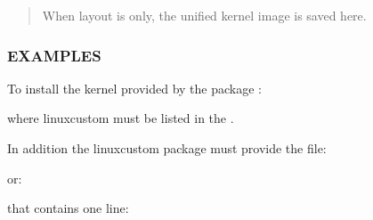 \documentclass[letterpaper,11pt,english]{sphinxmanual}
\begin{document}
\sphinxAtStartPar
{}
\begin{quote}

\sphinxAtStartPar
When layout is  only,
the unified kernel image is saved here.
\end{quote}


\subsubsection{EXAMPLES}
\label{\detokenize{_build/man-ready/sd-boot-kernel-update.8:examples}}
\sphinxAtStartPar
To install the kernel provided by the package :

\begin{sphinxVerbatim}[commandchars=\\\{\}]
\end{sphinxVerbatim}

\sphinxAtStartPar
where linux\sphinxhyphen{}custom must be listed in the .

\sphinxAtStartPar
In addition the linux\sphinxhyphen{}custom package must provide the file:

\begin{sphinxVerbatim}[commandchars=\\\{\}]
\end{sphinxVerbatim}

\sphinxAtStartPar
or:

\begin{sphinxVerbatim}[commandchars=\\\{\}]
\end{sphinxVerbatim}

\sphinxAtStartPar
that contains one line:

\begin{sphinxVerbatim}[commandchars=\\\{\}]
\end{sphinxVerbatim}
\end{document}
